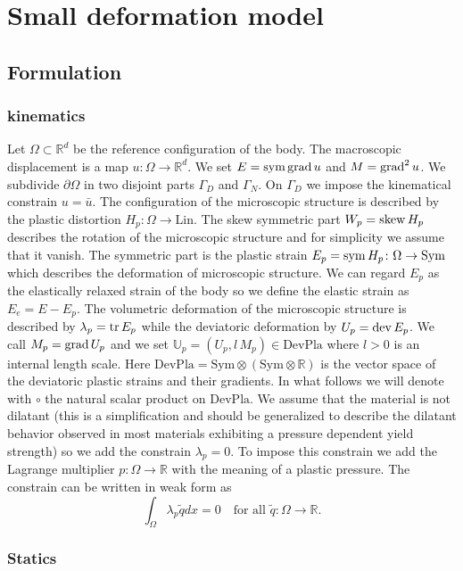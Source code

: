 \chapter{Small deformation model}

\section{Formulation}

\subsection{kinematics}

Let $\Omega\subset\mathbb{R}^d$ be the reference configuration of the body. The macroscopic displacement is a map $u\colon\Omega\to\mathbb{R}^d$. We set $E=\operatorname{sym}\operatorname{grad} u$ and $M=\operatorname{grad}^2 u$. We subdivide $\partial\Omega$ in two disjoint parts $\Gamma_D$ and $\Gamma_N$. On $\Gamma_D$ we impose the kinematical constrain $u=\bar u$. The configuration of the microscopic structure is described by the plastic distortion $H_p\colon\Omega\to\text{Lin}$. The skew symmetric part $W_p=\operatorname{skew} H_p$ describes the rotation of the microscopic structure and for simplicity we assume that it vanish. The symmetric part is the plastic strain $E_p=\operatorname{sym} H_p\colon\Omega\to\text{Sym}$ which describes the deformation of microscopic structure. We can regard $E_p$ as the elastically relaxed strain of the body so we define the elastic strain as $E_e=E-E_p$. The volumetric deformation of the microscopic structure is described by $\lambda_p=\operatorname{tr} E_p$ while the deviatoric deformation by $U_p=\operatorname{dev} E_p$. We call $M_p=\operatorname{grad} U_p$ and we set $\mathbb{U}_p=(U_p,l\,M_p)\in\text{DevPla}$ where $l>0$ is an internal length scale. Here $\text{DevPla}=\text{Sym}\otimes(\text{Sym}\otimes\mathbb{R})$ is the vector space of the deviatoric plastic strains and their gradients. In what follows we will denote with $\circ$ the natural scalar product on $\text{DevPla}$. We assume that the material is not dilatant (this is a simplification and should be generalized to describe the dilatant behavior observed in most materials exhibiting a pressure dependent yield strength) so we add the constrain $\lambda_p=0$. To impose this constrain we add the Lagrange multiplier $p\colon\Omega\to\mathbb{R}$ with the meaning of a plastic pressure. The constrain can be written in weak form as
\[
\int_\Omega\lambda_p\tilde qdx=0\quad\text{for all $\tilde q\colon\Omega\to\mathbb{R}$}.
\]

\subsection{Statics}

